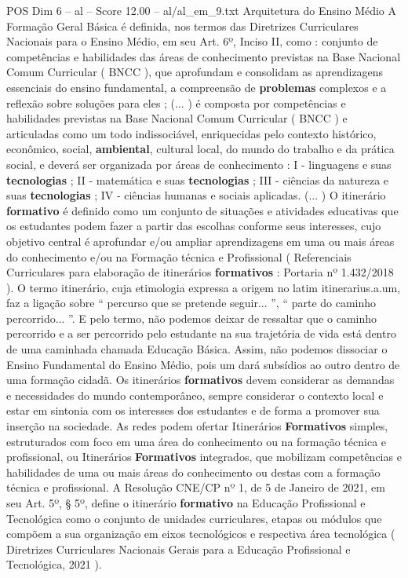 \begin{textsample}{POS Dim 6 – al – Score 12.00 – al/al\_em\_9.txt}
Arquitetura do Ensino Médio A Formação Geral Básica é definida, nos termos das Diretrizes Curriculares Nacionais para o Ensino Médio, em seu Art. 6º, Inciso II, como : conjunto de competências e habilidades das áreas de conhecimento previstas na Base Nacional Comum Curricular ( BNCC ), que aprofundam e consolidam as aprendizagens essenciais do ensino fundamental, a compreensão de \textbf{problemas} complexos e a reflexão sobre soluções para eles ; (... ) é composta por competências e habilidades previstas na Base Nacional Comum Curricular ( BNCC ) e articuladas como um todo indissociável, enriquecidas pelo contexto histórico, econômico, social, \textbf{ambiental}, cultural local, do mundo do trabalho e da prática social, e deverá ser organizada por áreas de conhecimento : I - linguagens e suas \textbf{tecnologias} ; II - matemática e suas \textbf{tecnologias} ; III - ciências da natureza e suas \textbf{tecnologias} ; IV - ciências humanas e sociais aplicadas. (... ) O itinerário \textbf{formativo} é definido como um conjunto de situações e atividades educativas que os estudantes podem fazer a partir das escolhas conforme seus interesses, cujo objetivo central é aprofundar e/ou ampliar aprendizagens em uma ou mais áreas do conhecimento e/ou na Formação técnica e Profissional ( Referenciais Curriculares para elaboração de itinerários \textbf{formativos} : Portaria nº 1.432/2018 ).
O termo itinerário, cuja etimologia expressa a origem no latim itinerarius.a.um, faz a ligação sobre “ percurso que se pretende seguir... ”, “ parte do caminho percorrido... ”.
E pelo termo, não podemos deixar de ressaltar que o caminho percorrido e a ser percorrido pelo estudante na sua trajetória de vida está dentro de uma caminhada chamada Educação Básica.
Assim, não podemos dissociar o Ensino Fundamental do Ensino Médio, pois um dará subsídios ao outro dentro de uma formação cidadã.
Os itinerários \textbf{formativos} devem considerar as demandas e necessidades do mundo contemporâneo, sempre considerar o contexto local e estar em sintonia com os interesses dos estudantes e de forma a promover sua inserção na sociedade.
As redes podem ofertar Itinerários \textbf{Formativos} simples, estruturados com foco em uma área do conhecimento ou na formação técnica e profissional, ou Itinerários \textbf{Formativos} integrados, que mobilizam competências e habilidades de uma ou mais áreas do conhecimento ou destas com a formação técnica e profissional.
A Resolução CNE/CP nº 1, de 5 de Janeiro de 2021, em seu Art. 5º, § 5º, define o itinerário \textbf{formativo} na Educação Profissional e Tecnológica como o conjunto de unidades curriculares, etapas ou módulos que compõem a sua organização em eixos tecnológicos e respectiva área tecnológica ( Diretrizes Curriculares Nacionais Gerais para a Educação Profissional e Tecnológica, 2021 ).

\end{textsample}
